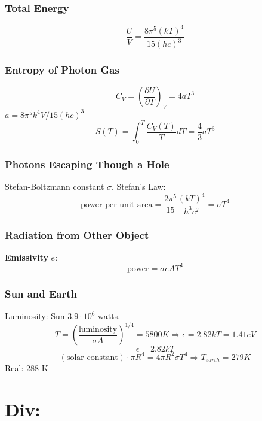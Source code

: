 \documentclass[a4paper,norsk, 10pt]{article}
\newcommand{\pd}[3]{\left(\frac{\partial #1}{\partial #2}\right)_{#3}}
\begin{document}
\subsubsection{Total Energy}
\begin{equation}
\frac{U}{V} = \frac{8\pi^5(kT)^4}{15(hc)^3}
\end{equation}
\subsubsection{Entropy of Photon Gas}
\begin{equation}
C_V = \pd{U}{T}{V} = 4aT^3
\end{equation}
$a = 8\pi^5k^4V/15(hc)^3$
\begin{equation}
S(T) = \int_0^T\frac{C_V(T)}{T}dT = \frac{4}{3}aT^3
\end{equation}
\subsubsection{Photons Escaping Though a Hole}
Stefan-Boltzmann constant $\sigma$. Stefan's Law:
\begin{equation}
\text{power per unit area} = \frac{2\pi^5}{15}\frac{(kT)^4}{h^3c^2} = \sigma T^4
\end{equation}
\subsubsection{Radiation from Other Object}
\textbf{Emissivity} $e$:
\begin{equation}
\text{power} = \sigma e A T^4
\end{equation}
\subsubsection{Sun and Earth}
Luminosity: Sun $3.9\cdot 10^{6}$ watts.
\begin{equation}
T = \left(\frac{\text{luminosity}}{\sigma A}\right)^{1/4} = 5800 K \Rightarrow\epsilon = 2.82kT = 1.41 eV
\end{equation}
\begin{equation}
\epsilon = 2.82kT
\end{equation}
\begin{equation}
(\text{solar constant}) \cdot \pi R^4 = 4\pi R^2 \sigma T^4 \Rightarrow T_{earth} = 279 K
\end{equation}
Real: $288$ K

\section{Div:}
\end{document}

